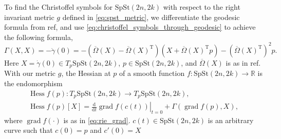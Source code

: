To find the Christoffel symbols for $\mathrm{SpSt}(2n, 2k)$ with respect to the right invariant metric $g$ defined in \eqref{eq:spst_metric}, we differentiate the geodesic formula from ref, and use \eqref{eq:christoffel_symbols_through_geodesic} to achieve the following formula,
\begin{equation*}
    \Gamma(X,X)=-\ddot{\gamma}(0)=-(\overline{\Omega}(X)-\overline{\Omega}(X)^{\mathrm{T}})(X+\overline{\Omega}(X)^{\mathrm{T}}p)-(\overline{\Omega}(X)^{\mathrm{T}})^{2}p.
\end{equation*}
Here $X=\dot{\gamma}(0)\in T_{p}\mathrm{SpSt}(2n, 2k)$, $p\in \mathrm{SpSt}(2n, 2k)$, and $\overline{\Omega}(X)$ is as in ref. 
With our metric $g$, the Hessian at $p$ of a smooth function $f\colon \mathrm{SpSt}(2n, 2k)\xrightarrow{}\mathbb{R}$ is the endomorphism 
\begin{gather*}
    \operatorname{Hess}f(p)\colon T_{p}\mathrm{SpSt}(2n, 2k)\xrightarrow{}T_{p}\mathrm{SpSt}(2n, 2k),  \\
    \operatorname{Hess}f(p)[X]=\left.\frac{\mathrm{d}}{\mathrm{d}t}\operatorname{grad}f(c(t))\right|_{t=0}+\Gamma(\operatorname{grad}f(p),X),
\end{gather*}
where $\operatorname{grad}f(\cdot)$ is as in \ref{eq:rie_grad}. $c(t)\in \mathrm{SpSt}(2n, 2k)$ is an arbitrary curve such that $c(0)=p$ and $c'(0)=X$ %